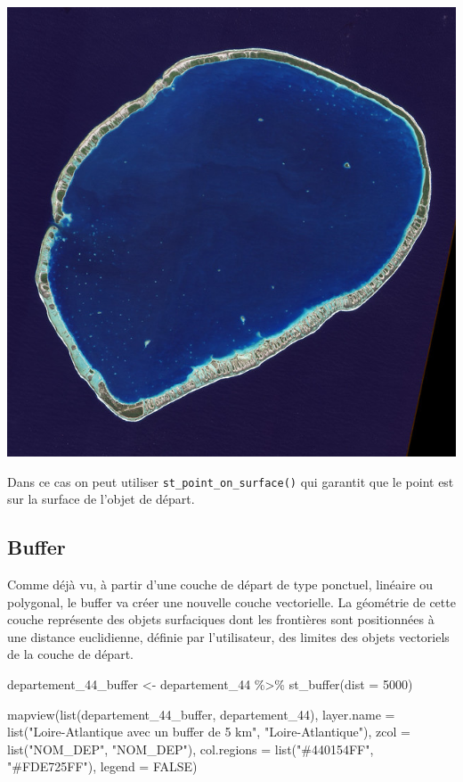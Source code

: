 \documentclass[
]{book}
\newenvironment{Shaded}{\begin{snugshade}}{\end{snugshade}}
\newcommand{\AttributeTok}[1]{\textcolor[rgb]{0.77,0.63,0.00}{#1}}
\newcommand{\ConstantTok}[1]{\textcolor[rgb]{0.00,0.00,0.00}{#1}}
\newcommand{\DecValTok}[1]{\textcolor[rgb]{0.00,0.00,0.81}{#1}}
\newcommand{\FunctionTok}[1]{\textcolor[rgb]{0.00,0.00,0.00}{#1}}
\newcommand{\NormalTok}[1]{#1}
\newcommand{\OtherTok}[1]{\textcolor[rgb]{0.56,0.35,0.01}{#1}}
\newcommand{\SpecialCharTok}[1]{\textcolor[rgb]{0.00,0.00,0.00}{#1}}
\newcommand{\StringTok}[1]{\textcolor[rgb]{0.31,0.60,0.02}{#1}}
\begin{document}
\includegraphics{pic/atoll.jpg}

Dans ce cas on peut utiliser \texttt{st\_point\_on\_surface()} qui garantit que le point est sur la surface de l'objet de départ.

\hypertarget{buffer}{%
\subsection{Buffer}\label{buffer}}

Comme déjà vu, à partir d'une couche de départ de type ponctuel, linéaire ou polygonal, le buffer va créer une nouvelle couche vectorielle. La géométrie de cette couche représente des objets surfaciques dont les frontières sont positionnées à une distance euclidienne, définie par l'utilisateur, des limites des objets vectoriels de la couche de départ.

\begin{Shaded}
\begin{Highlighting}[]
\NormalTok{departement\_44\_buffer }\OtherTok{\textless{}{-}}\NormalTok{ departement\_44 }\SpecialCharTok{\%\textgreater{}\%}
  \FunctionTok{st\_buffer}\NormalTok{(}\AttributeTok{dist =} \DecValTok{5000}\NormalTok{)}

\FunctionTok{mapview}\NormalTok{(}\FunctionTok{list}\NormalTok{(departement\_44\_buffer, departement\_44), }\AttributeTok{layer.name =} \FunctionTok{list}\NormalTok{(}\StringTok{"Loire{-}Atlantique avec un buffer de 5 km"}\NormalTok{, }\StringTok{"Loire{-}Atlantique"}\NormalTok{), }\AttributeTok{zcol =} \FunctionTok{list}\NormalTok{(}\StringTok{"NOM\_DEP"}\NormalTok{, }\StringTok{"NOM\_DEP"}\NormalTok{), }\AttributeTok{col.regions =} \FunctionTok{list}\NormalTok{(}\StringTok{"\#440154FF"}\NormalTok{, }\StringTok{"\#FDE725FF"}\NormalTok{), }\AttributeTok{legend =} \ConstantTok{FALSE}\NormalTok{)}
\end{Highlighting}
\end{Shaded}
\end{document}
